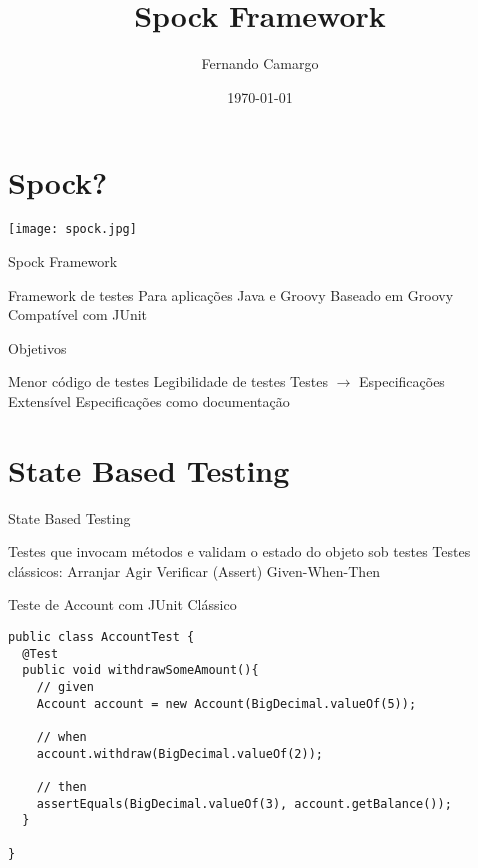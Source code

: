\documentclass{beamer}
\title{Spock Framework}
\date{\today}
\author{Fernando Camargo}
\institute{ZG Soluções}
\begin{document}
\maketitle

\section{Spock?}

\begin{frame}
  \begin{center}
    \texttt{[image: spock.jpg]}
  \end{center}
\end{frame}

\begin{frame}{Spock Framework}
 \begin{outline}
    Framework de testes
    Para aplicações Java e Groovy
    Baseado em Groovy
    Compatível com JUnit
 \end{outline}
\end{frame}

\begin{frame}{Objetivos}
 \begin{outline}
    Menor código de testes
    Legibilidade de testes
    Testes $\rightarrow$ Especificações
    Extensível
    Especificações como documentação
 \end{outline}
\end{frame}

\section{State Based Testing}

\begin{frame}{State Based Testing}
 \begin{outline}
    Testes que invocam métodos e validam o estado do objeto sob testes
    Testes clássicos:
     Arranjar
     Agir
     Verificar (Assert)
    Given-When-Then
 \end{outline}
\end{frame}

\begin{frame}[fragile]{Teste de Account com JUnit Clássico}
 \begin{verbatim}
public class AccountTest {
  @Test
  public void withdrawSomeAmount(){
    // given
    Account account = new Account(BigDecimal.valueOf(5));
    
    // when
    account.withdraw(BigDecimal.valueOf(2));
    
    // then
    assertEquals(BigDecimal.valueOf(3), account.getBalance());
  }
  
}
  \end{verbatim}
\end{frame}
\end{document}
